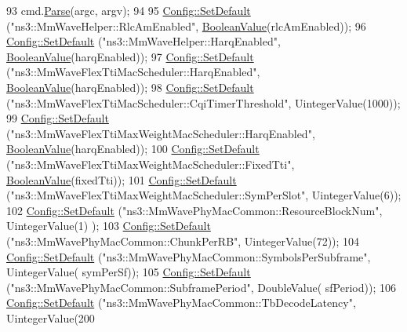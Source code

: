\begin{DoxyCode}
93         cmd.\hyperlink{classns3_1_1CommandLine_a5c10b85b3207e5ecb48d907966923156}{Parse}(argc, argv);
94 
95         \hyperlink{group__config_ga2e7882df849d8ba4aaad31c934c40c06}{Config::SetDefault} (\textcolor{stringliteral}{"ns3::MmWaveHelper::RlcAmEnabled"}, 
      \hyperlink{classns3_1_1BooleanValue}{BooleanValue}(rlcAmEnabled));
96         \hyperlink{group__config_ga2e7882df849d8ba4aaad31c934c40c06}{Config::SetDefault} (\textcolor{stringliteral}{"ns3::MmWaveHelper::HarqEnabled"}, 
      \hyperlink{classns3_1_1BooleanValue}{BooleanValue}(harqEnabled));
97         \hyperlink{group__config_ga2e7882df849d8ba4aaad31c934c40c06}{Config::SetDefault} (\textcolor{stringliteral}{"ns3::MmWaveFlexTtiMacScheduler::HarqEnabled"}, 
      \hyperlink{classns3_1_1BooleanValue}{BooleanValue}(harqEnabled));
98         \hyperlink{group__config_ga2e7882df849d8ba4aaad31c934c40c06}{Config::SetDefault} (\textcolor{stringliteral}{"ns3::MmWaveFlexTtiMacScheduler::CqiTimerThreshold"}, 
      UintegerValue(1000));
99         \hyperlink{group__config_ga2e7882df849d8ba4aaad31c934c40c06}{Config::SetDefault} (\textcolor{stringliteral}{"ns3::MmWaveFlexTtiMaxWeightMacScheduler::HarqEnabled"}, 
      \hyperlink{classns3_1_1BooleanValue}{BooleanValue}(harqEnabled));
100         \hyperlink{group__config_ga2e7882df849d8ba4aaad31c934c40c06}{Config::SetDefault} (\textcolor{stringliteral}{"ns3::MmWaveFlexTtiMaxWeightMacScheduler::FixedTti"}, 
      \hyperlink{classns3_1_1BooleanValue}{BooleanValue}(fixedTti));
101         \hyperlink{group__config_ga2e7882df849d8ba4aaad31c934c40c06}{Config::SetDefault} (\textcolor{stringliteral}{"ns3::MmWaveFlexTtiMaxWeightMacScheduler::SymPerSlot"}, 
      UintegerValue(6));
102         \hyperlink{group__config_ga2e7882df849d8ba4aaad31c934c40c06}{Config::SetDefault} (\textcolor{stringliteral}{"ns3::MmWavePhyMacCommon::ResourceBlockNum"}, UintegerValue(1)
      );
103         \hyperlink{group__config_ga2e7882df849d8ba4aaad31c934c40c06}{Config::SetDefault} (\textcolor{stringliteral}{"ns3::MmWavePhyMacCommon::ChunkPerRB"}, UintegerValue(72));
104         \hyperlink{group__config_ga2e7882df849d8ba4aaad31c934c40c06}{Config::SetDefault} (\textcolor{stringliteral}{"ns3::MmWavePhyMacCommon::SymbolsPerSubframe"}, UintegerValue(
      symPerSf));
105         \hyperlink{group__config_ga2e7882df849d8ba4aaad31c934c40c06}{Config::SetDefault} (\textcolor{stringliteral}{"ns3::MmWavePhyMacCommon::SubframePeriod"}, DoubleValue(
      sfPeriod));
106         \hyperlink{group__config_ga2e7882df849d8ba4aaad31c934c40c06}{Config::SetDefault} (\textcolor{stringliteral}{"ns3::MmWavePhyMacCommon::TbDecodeLatency"}, UintegerValue(200

\end{DoxyCode}
